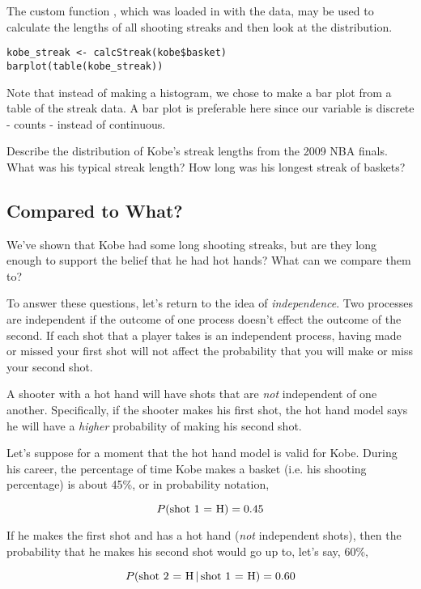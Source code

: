 \documentclass[11pt]{article}
\begin{document}
The custom function , which was loaded in with the data, may be used to calculate the lengths of all shooting streaks and then look at the distribution.

\begin{lstlisting}
kobe_streak <- calcStreak(kobe$basket)
barplot(table(kobe_streak))
\end{lstlisting}


Note that instead of making a histogram, we chose to make a bar plot from a table of the streak data.  A bar plot is preferable here since our variable is discrete - counts - instead of continuous.

\begin{exercise}
\label{kobeStreak}
Describe the distribution of Kobe's streak lengths from the 2009 NBA finals.  What was his typical streak length?  How long was his longest streak of baskets?
\end{exercise}


\subsection*{Compared to What?}
We've shown that Kobe had some long shooting streaks, but are they long enough to support the belief that he had hot hands?  What can we compare them to?

To answer these questions, let's return to the idea of \emph{independence}.  Two processes are independent if the outcome of one process doesn't effect the outcome of the second.  If each shot that a player takes is an independent process, having made or missed your first shot will not affect the probability that you will make or miss your second shot.

A shooter with a hot hand will have shots that are \emph{not} independent of one another.  Specifically, if the shooter makes his first shot, the hot hand model says he will have a \emph{higher} probability of making his second shot.

Let's suppose for a moment that the hot hand model is valid for Kobe.  During his career, the percentage of time Kobe makes a basket (i.e. his shooting percentage) is about 45\%, or in probability notation,

\[ P(\textnormal{shot 1 = H}) = 0.45 \]

If he makes the first shot and has a hot hand (\emph{not} independent shots), then the probability that he makes his second shot would go up to, let's say, 60\%,

\[ P\textnormal{(shot 2 = H} \, | \, \textnormal{shot 1 = H}) = 0.60 \]
\end{document}
